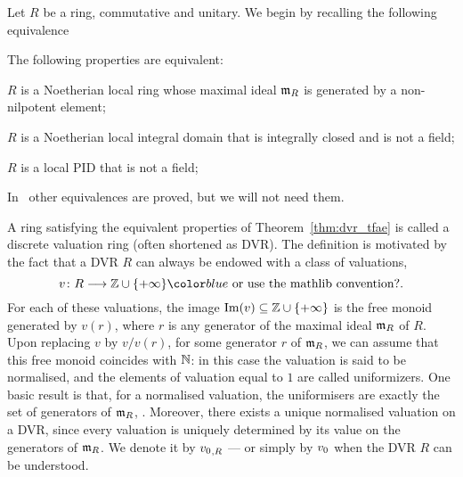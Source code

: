\documentclass[sigplan,10pt,anonymous,review]{acmart}
\begin{document}
Let $R$ be a ring,  commutative and unitary. We begin by recalling the following equivalence
\begin{theorem}\label{thm:dvr_tfae}
The following properties are equivalent:
\begin{listResults}
\item $R$ is a Noetherian local ring whose maximal ideal $\mathfrak{m}_{R}$ is generated by a non-nilpotent element;
\item $R$ is a Noetherian local integral domain that is integrally closed and is not a field;
\item $R$ is a local PID that is not a field;
\end{listResults}
\end{theorem}
\begin{remark}
In~\cite[Chapitre~VI, \S3, n$^\circ$ 6, Proposition~8]{Bou85} other equivalences are proved, but we will not need them.
\end{remark}
A ring satisfying the equivalent properties of Theorem~\ref{thm:dvr_tfae} is called a discrete valuation ring (often shortened as DVR). The definition is motivated by the fact that a DVR $R$ can always be endowed with a class of valuations, 
\[
v\colon R\longrightarrow \ZZ\cup\{+\infty\}\fil{\text{ or use the mathlib convention?}}.
\]
For each of these valuations, the image $\operatorname{Im}(v)\subseteq\mathbb{Z}\cup \{+\infty\}$ is the free monoid generated by $v(r)$, where $r$ is any generator of the maximal ideal $\mathfrak{m}_{R}$ of $R$. Upon replacing $v$ by $v/v(r)$, for some generator $r$ of $\mathfrak{m}_{R}$, we can assume that this free monoid coincides with $\mathbb{N}$: in this case the valuation is said to be normalised, and the elements of valuation equal to $1$ are called uniformizers. One basic result is that, for a normalised valuation, the uniformisers are exactly the set of generators of $\mathfrak{m}_{R}$, . Moreover, there exists a unique normalised valuation on a DVR, since every valuation is uniquely determined by its value on the generators of $\mathfrak{m}_{R}$. We denote it by ${{v}_{0}}_{,R}$ --- or simply by ${v}_{0}$ when the DVR $R$ can be understood.
\end{document}
